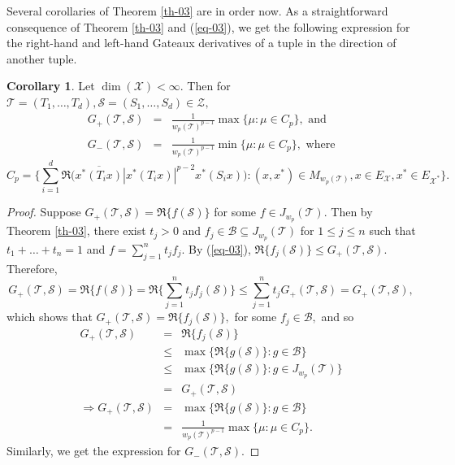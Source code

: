 \documentclass{amsart}
\theoremstyle{definition}
\newtheorem{cor}[theorem]{Corollary}
\theoremstyle{remark}
\numberwithin{equation}{section}
\begin{document}
Several corollaries of Theorem \ref{th-03} are in order now. As a straightforward consequence of Theorem \ref{th-03} and (\ref{eq-03}), we get the following expression for the right-hand and left-hand Gateaux derivatives of a tuple in the direction of another tuple.
\begin{cor}\label{cor-02}
	Let $\dim(\mathcal{X})<\infty.$ Then for $\mathcal{T}=(T_1,\ldots,T_d),\mathcal{S}=(S_1,\ldots,S_d) \in \mathcal{Z},$ 
		\begin{eqnarray*}
		G_+(\mathcal{T},\mathcal{S})
		&=&\frac{1}{w_p(\mathcal{T})^{p-1}}\max\{\mu:\mu\in C_p\}, \text{ and }\\
		G_-(\mathcal{T},\mathcal{S})
		&=&\frac{1}{w_p(\mathcal{T})^{p-1}}\min\{\mu:\mu\in C_p\}, \text{ where}
			\end{eqnarray*}
		\[C_p=\bigg\{\sum_{i=1}^d\Re\bigg(\overline{x^*(T_ix)}|x^*(T_ix)|^{p-2}x^*(S_ix) \bigg):(x,x^*)\in M_{w_p(\mathcal{T})}, x\in E_{\mathcal{X}},x^*\in E_{\mathcal{X}^*}\bigg\}.\]
\end{cor}
\begin{proof}
Suppose $G_+(\mathcal{T},\mathcal{S})=\Re\{f(\mathcal{S})\}$ for some $f\in J_{w_p}(\mathcal{T}).$	Then by Theorem \ref{th-03}, there exist $t_j>0$ and $f_j\in \mathcal{B}\subseteq J_{w_p}(\mathcal{T})$ for $1\leq j\leq n$ such that $t_1+\ldots+t_n=1$ and $f=\sum_{j=1}^nt_jf_j.$ By (\ref{eq-03}), $\Re\{f_j(\mathcal{S})\}\leq G_+(\mathcal{T},\mathcal{S}).$ Therefore,
\[G_+(\mathcal{T},\mathcal{S})=\Re\{f(\mathcal{S})\}=\Re\{\sum_{j=1}^nt_jf_j(\mathcal{S})\}\leq \sum_{j=1}^nt_jG_+(\mathcal{T},\mathcal{S})=G_+(\mathcal{T},\mathcal{S}),\] which shows that $G_+(\mathcal{T},\mathcal{S})=\Re\{f_j(\mathcal{S})\},$ for some $f_j\in \mathcal{B},$ and so
\begin{eqnarray*}
G_+(\mathcal{T},\mathcal{S})&=&\Re\{f_j(\mathcal{S})\}\\
&\leq& \max\{\Re\{g(\mathcal{S})\}:g\in \mathcal{B}\}\\
&\leq& \max\{\Re\{g(\mathcal{S})\}:g\in J_{w_p}(\mathcal{T})\}\\
&=&G_+(\mathcal{T},\mathcal{S})\\
\Rightarrow G_+(\mathcal{T},\mathcal{S})&=&  \max\{\Re\{g(\mathcal{S})\}:g\in \mathcal{B}\}\\
&=&\frac{1}{w_p(\mathcal{T})^{p-1}}\max\{\mu:\mu\in C_p\}.
\end{eqnarray*}
Similarly, we get the expression for $G_-(\mathcal{T},\mathcal{S}).$
\end{proof}
\end{document}

